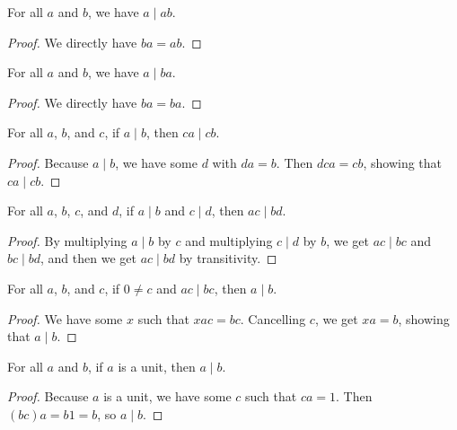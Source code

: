 \documentclass[../../math.tex]{subfiles}
\begin{document}
\begin{theorem} \label{mult_div_lself}
    For all $a$ and $b$, we have $a \mid ab$.
\end{theorem}
\begin{proof}
    We directly have $ba = ab$.
\end{proof}

\begin{theorem} \label{mult_div_rself}
    For all $a$ and $b$, we have $a \mid ba$.
\end{theorem}
\begin{proof}
    We directly have $ba = ba$.
\end{proof}

\begin{theorem} \label{div_lmult} \label{div_rmult}
    For all $a$, $b$, and $c$, if $a \mid b$, then $ca \mid cb$.
\end{theorem}
\begin{proof}
    Because $a \mid b$, we have some $d$ with $da = b$.  Then $dca = cb$,
    showing that $ca \mid cb$.
\end{proof}

\begin{theorem} \label{div_lrmult}
    For all $a$, $b$, $c$, and $d$, if $a \mid b$ and $c \mid d$, then $ac \mid
    bd$.
\end{theorem}
\begin{proof}
    By multiplying $a \mid b$ by $c$ and multiplying $c \mid d$ by $b$, we get
    $ac \mid bc$ and $bc \mid bd$, and then we get $ac \mid bd$ by transitivity.
\end{proof}

\begin{theorem} \label{div_rcancel} \label{div_lcancel}
    For all $a$, $b$, and $c$, if $0 \neq c$ and $ac \mid bc$, then $a \mid b$.
\end{theorem}
\begin{proof}
    We have some $x$ such that $xac = bc$.  Cancelling $c$, we get $xa = b$,
    showing that $a \mid b$.
\end{proof}

\begin{theorem} \label{unit_div}
    For all $a$ and $b$, if $a$ is a unit, then $a \mid b$.
\end{theorem}
\begin{proof}
    Because $a$ is a unit, we have some $c$ such that $ca = 1$.  Then $(bc)a =
    b1 = b$, so $a \mid b$.
\end{proof}
\end{document}

